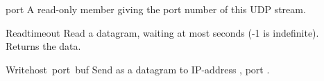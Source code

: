 \begin{datadesc}{port}
A read-only member giving the port number of this UDP stream.
\end{datadesc}

\begin{funcdesc}{Read}{timeout}
Read a datagram, waiting at most  seconds (-1 is
indefinite). Returns the data.
\end{funcdesc}

\begin{funcdesc}{Write}{host\, port\, buf}
Send  as a datagram to IP-address , port
.
\end{funcdesc}
